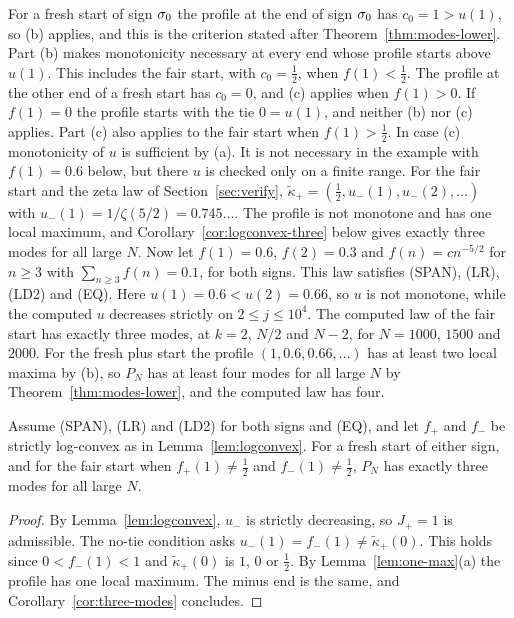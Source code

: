 For a fresh start of sign $\sigma_0$ the profile at the end of sign $\sigma_0$ has $c_0=1>u(1)$,
so (b) applies, and this is the criterion stated after Theorem~\ref{thm:modes-lower}. Part (b)
makes monotonicity necessary at every end whose profile starts above $u(1)$. This includes the
fair start, with $c_0=\frac12$, when $f(1)<\frac12$. The profile at the other end of a fresh
start has $c_0=0$, and (c) applies when $f(1)>0$. If $f(1)=0$ the profile starts with the tie
$0=u(1)$, and neither (b) nor (c) applies. Part (c) also applies to the fair start when
$f(1)>\frac12$. In case (c) monotonicity of $u$ is sufficient by (a). It is not necessary in
the example with $f(1)=0.6$ below, but there $u$ is checked only on a finite range. For the fair start and the zeta law of Section~\ref{sec:verify},
$\widetilde\kappa_\plus=(\frac12,u_\minus(1),u_\minus(2),\dots)$ with
$u_\minus(1)=1/\zeta(5/2)=0.745\ldots$. The profile is not monotone and has one local maximum,
and Corollary~\ref{cor:logconvex-three} below gives exactly three modes for all large $N$. Now
let $f(1)=0.6$, $f(2)=0.3$ and $f(n)=cn^{-5/2}$ for $n\ge3$ with $\sum_{n\ge3}f(n)=0.1$, for
both signs. This law satisfies (SPAN), (LR), (LD2) and (EQ). Here $u(1)=0.6<u(2)=0.66$, so $u$ is
not monotone, while the computed $u$ decreases strictly on $2\le j\le10^4$. The computed law of
the fair start has exactly three modes, at $k=2$, $N/2$ and $N-2$, for $N=1000$, $1500$ and
$2000$. For the fresh plus start the profile $(1,0.6,0.66,\dots)$ has at least two local maxima by (b),
so $P_N$ has at least four modes for all large $N$ by Theorem~\ref{thm:modes-lower}, and the
computed law has four.

\begin{corollary}\label{cor:logconvex-three}
Assume (SPAN), (LR) and (LD2) for both signs and (EQ), and let $f_\plus$ and $f_\minus$ be
strictly log-convex as in Lemma~\ref{lem:logconvex}. For a fresh start of either sign, and for
the fair start when $f_\plus(1)\ne\frac12$ and $f_\minus(1)\ne\frac12$, $P_N$ has exactly three
modes for all large $N$.
\end{corollary}

\begin{proof}
By Lemma~\ref{lem:logconvex}, $u_\minus$ is strictly decreasing, so $J_\plus=1$ is admissible.
The no-tie condition asks $u_\minus(1)=f_\minus(1)\ne\widetilde\kappa_\plus(0)$. This holds
since $0<f_\minus(1)<1$ and $\widetilde\kappa_\plus(0)$ is $1$, $0$ or $\frac12$. By
Lemma~\ref{lem:one-max}(a) the profile has one local maximum. The minus end is the same, and
Corollary~\ref{cor:three-modes} concludes.
\end{proof}

